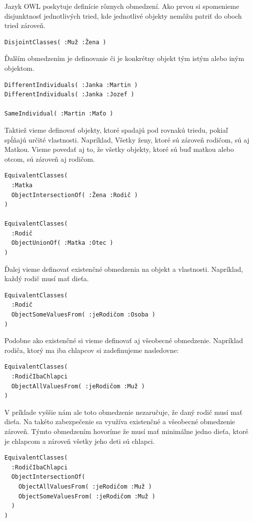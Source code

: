 \documentclass[12pt, a4paper, oneside]{book}
\begin{document}
Jazyk OWL poskytuje definície rôznych obmedzení. Ako prvou si spomenieme disjunktnosť jednotlivých tried, kde jednotlivé objekty nemôžu patriť do oboch tried zároveň.
\begin{verbatim}
DisjointClasses( :Muž :Žena )
\end{verbatim}


Ďalším obmedzením je definovanie či je konkrétny objekt tým istým alebo iným objektom.
\begin{verbatim}
DifferentIndividuals( :Janka :Martin )
DifferentIndividuals( :Janka :Jozef )

SameIndividual( :Martin :Maťo )
\end{verbatim}


Taktiež vieme definovať objekty, ktoré spadajú pod rovnakú triedu, pokiaľ spĺňajú určité vlastnosti. Napríklad, Všetky ženy, ktoré sú zároveň rodičom, sú aj Matkou. Vieme povedať aj to, že všetky objekty, ktoré sú buď matkou alebo otcom, sú zároveň aj rodičom.
\begin{verbatim}
EquivalentClasses(
  :Matka 
  ObjectIntersectionOf( :Žena :Rodič )
) 

EquivalentClasses(
  :Rodič 
  ObjectUnionOf( :Matka :Otec )
) 
\end{verbatim}


Ďalej vieme definovať existenčné obmedzenia na objekt a vlastnosti. Napríklad, každý rodič musí mať dieťa.
\begin{verbatim}
EquivalentClasses(
  :Rodič 
  ObjectSomeValuesFrom( :jeRodičom :Osoba )
)
\end{verbatim}


Podobne ako existenčné si vieme definovať aj všeobecné obmedzenie. Napríklad rodiča, ktorý ma iba chlapcov si zadefinujeme nasledovne:
\begin{verbatim}
EquivalentClasses(
  :RodičIbaChlapci 
  ObjectAllValuesFrom( :jeRodičom :Muž )
)
\end{verbatim}


V príklade vyššie nám ale toto obmedzenie nezaručuje, že daný rodič musí mať dieťa. Na takéto zabezpečenie sa využíva existenčné a všeobecné obmedzenie zároveň. Týmto obmedzením hovoríme že musí mať minimálne jedno dieťa, ktoré je chlapcom a zároveň všetky jeho deti sú chlapci.
\begin{verbatim}
EquivalentClasses(
  :RodičIbaChlapci 
  ObjectIntersectionOf(
    ObjectAllValuesFrom( :jeRodičom :Muž )
    ObjectSomeValuesFrom( :jeRodičom :Muž )
  )
)
\end{verbatim}
\end{document}
